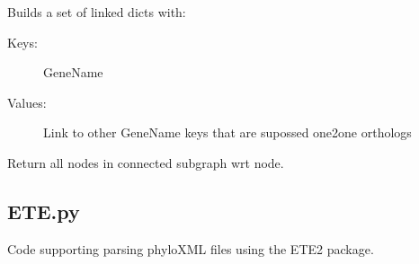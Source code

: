 \documentclass[letterpaper,10pt,english]{sphinxmanual}
\begin{document}

\begin{fulllineitems}
\label{code:gfunc.parsers.edge_lists.combine_multiple_one2one_tables}
Builds a set of linked dicts with:
\begin{description}
\item[{Keys:}] \leavevmode
GeneName

\item[{Values:}] \leavevmode
Link to other GeneName keys that are supossed one2one orthologs

\end{description}

\end{fulllineitems}


\begin{fulllineitems}
\label{code:gfunc.parsers.edge_lists.follow_all_links}
Return all nodes in connected subgraph wrt node.

\end{fulllineitems}

\label{code:module-gfunc.parsers.ETE}

\subsection{ETE.py}
\label{code:ete-py}
Code supporting parsing phyloXML files using the ETE2 package.
\end{document}
